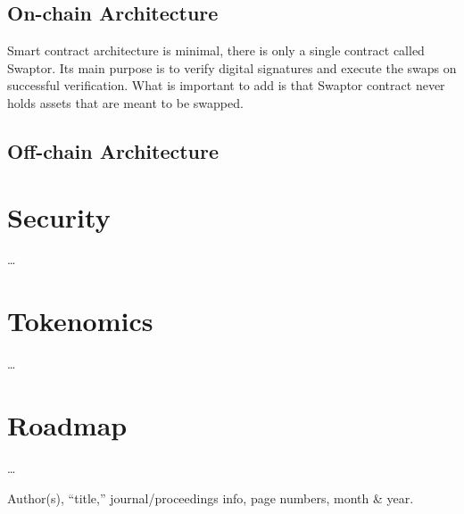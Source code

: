 \documentclass[12pt]{article}
\begin{document}
\subsection{On-chain Architecture}
\indent Smart contract architecture is minimal, there is only a single contract called Swaptor.
Its main purpose is to verify digital signatures and execute the swaps on successful verification. 
What is important to add is that Swaptor contract never holds assets that are meant to be swapped.


\subsection{Off-chain Architecture}

\section{Security} \label{subm}
\dots

\section{Tokenomics}
\dots

\section{Roadmap}
\dots

\begin{thebibliography}{9}
  Author(s), ``title,'' journal/proceedings info, page numbers,
  month \& year.
\end{thebibliography}
\end{document}
